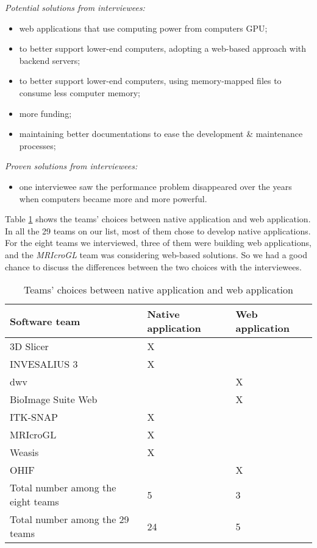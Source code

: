 \noindent\textit{Potential solutions from interviewees:}
\begin{itemize}
\item web applications that use computing power from computers GPU;
\item to better support lower-end computers, adopting a web-based approach with backend servers;
\item to better support lower-end computers, using memory-mapped files to consume less computer memory;
\item more funding;
\item maintaining better documentations to ease the development \& maintenance processes;
\end{itemize}

\noindent\textit{Proven solutions from interviewees:}
\begin{itemize}
\item one interviewee saw the performance problem disappeared over the years when computers became more and more powerful. 
\end{itemize}

Table \ref{tab_native_vs_web} shows the teams' choices between native application and web application. In all the 29 teams on our list, most of them chose to develop native applications. For the eight teams we interviewed, three of them were building web applications, and the \textit{MRIcroGL} team was considering web-based solutions. So we had a good chance to discuss the differences between the two choices with the interviewees.

\begin{table}[H]
\centering
\begin{tabular}{lll}
\hline
Software team & Native application & Web application \\ \hline
3D Slicer & X & \\
INVESALIUS 3 & X & \\
dwv & & X \\
BioImage Suite Web & & X \\
ITK-SNAP & X & \\
MRIcroGL & X & \\
Weasis & X & \\
OHIF & & X \\ \hdashline
Total number among the eight teams & 5 & 3 \\
Total number among the 29 teams & 24 & 5 \\ \hline
\end{tabular}
\caption{\label{tab_native_vs_web}Teams' choices between native application and web application}
\end{table}

